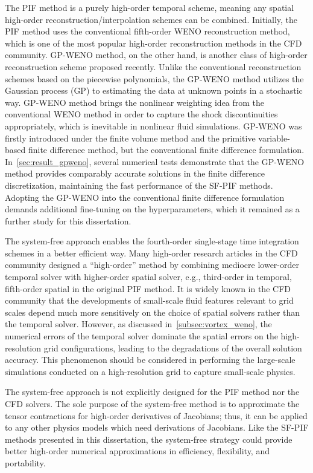 The PIF method is a purely high-order temporal scheme,
meaning any spatial high-order reconstruction/interpolation schemes can be combined.
Initially, the PIF method uses the conventional fifth-order WENO reconstruction method,
which is one of the most popular high-order reconstruction methods in the CFD community.
GP-WENO method, on the other hand, is another class of high-order reconstruction scheme proposed recently.
Unlike the conventional reconstruction schemes based on the piecewise polynomials,
the GP-WENO method utilizes the Gaussian process (GP) to estimating the data at unknown points in a stochastic way.
GP-WENO method brings the nonlinear weighting idea from the conventional WENO method
in order to capture the shock discontinuities appropriately,
which is inevitable in nonlinear fluid simulations.
GP-WENO was firstly introduced under the finite volume method and
the primitive variable-based finite difference method,
but the conventional finite difference formulation.
In~\cref{sec:result_gpweno}, several numerical tests demonstrate that
the GP-WENO method provides comparably accurate solutions in the finite difference discretization,
maintaining the fast performance of the SF-PIF methods.
Adopting the GP-WENO into the conventional finite difference formulation demands
additional fine-tuning on the hyperparameters,
which it remained as a further study for this dissertation.

The system-free approach enables the fourth-order single-stage time integration schemes in a better efficient way.
Many high-order research articles in the CFD community designed a ``high-order'' method
by combining mediocre lower-order temporal solver with higher-order spatial solver,
e.g., third-order in temporal, fifth-order spatial in the original PIF method.
It is widely known in the CFD community that the developments of small-scale fluid features
relevant to grid scales depend much more sensitively on the choice of spatial solvers
rather than the temporal solver.
However, as discussed in~\cref{subsec:vortex_weno}, the numerical errors of the temporal solver
dominate the spatial errors on the high-resolution grid configurations,
leading to the degradations of the overall solution accuracy.
This phenomenon should be considered in performing the large-scale simulations
conducted on a high-resolution grid to capture small-scale physics.

The system-free approach is not explicitly designed for the PIF method nor the CFD solvers.
The sole purpose of the system-free method is to approximate the tensor contractions
for high-order derivatives of Jacobians;
thus, it can be applied to any other physics models which need derivations of Jacobians.
Like the SF-PIF methods presented in this dissertation,
the system-free strategy could provide better high-order numerical approximations
in efficiency, flexibility, and portability.
